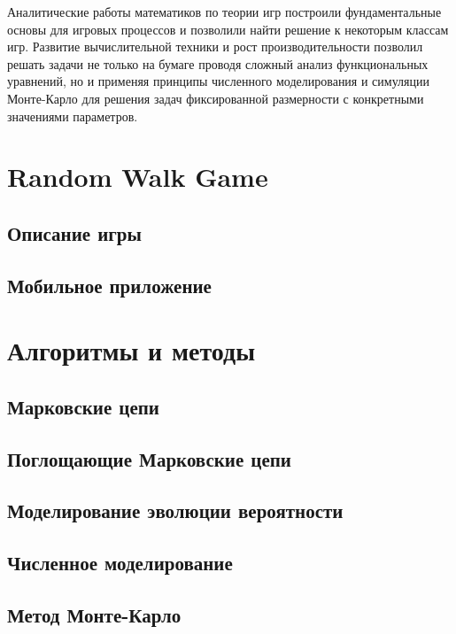 Аналитические работы математиков по теории игр построили фундаментальные основы для игровых процессов и позволили найти решение к некоторым классам игр.
Развитие вычислительной техники и рост производительности позволил решать задачи не только на бумаге проводя сложный анализ функциональных уравнений,
но и применяя принципы численного моделирования и симуляции Монте-Карло \cite{} для решения задач фиксированной размерности с конкретными значениями параметров.



\section{Random Walk Game}\label{sec:ch1/sec2}

\subsection{Описание игры}\label{subsec:ch1/sec2/sub1}

\subsection{Мобильное приложение}\label{subsec:ch1/sec2/sub2}

\section{Алгоритмы и методы}\label{sec:ch1/sec3}

\subsection{Марковские цепи}\label{subsec:ch1/sec3/sub1}

\subsection{Поглощающие Марковские цепи}\label{subsec:ch1/sec3/sub2}
\subsection{Моделирование эволюции вероятности}\label{subsec:ch1/sec3/sub3}
\subsection{Численное моделирование}\label{subsec:ch1/sec3/sub4}
\subsection{Метод Монте-Карло}\label{subsec:ch1/sec3/sub5}
